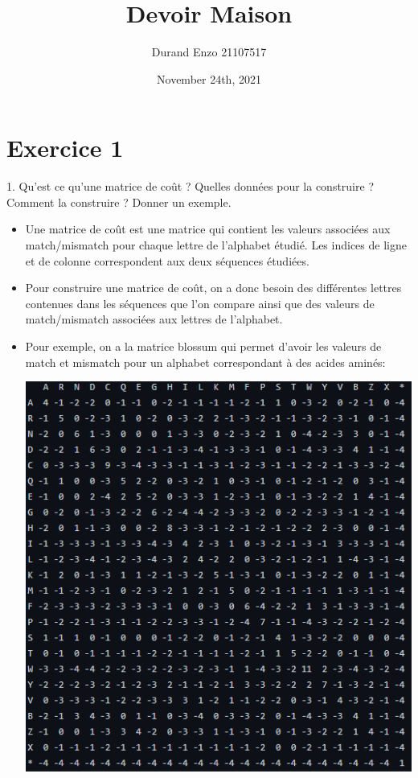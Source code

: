 \documentclass[
	12pt, %
]{fphw}
\title{Devoir Maison} %
\author{Durand Enzo 21107517} %
\date{November 24th, 2021} %
\institute{Sorbonne Université} %
\begin{document}
\maketitle %


\section*{Exercice 1}

\begin{problem}
	1. Qu'est ce qu'une matrice de coût ? Quelles données pour la construire ? Comment la construire ? Donner un exemple.
\end{problem}
\begin{center}
	\begin{itemize}
		\item Une matrice de coût est une matrice qui contient les valeurs associées aux match/mismatch pour chaque lettre de l'alphabet étudié. Les indices de ligne et de colonne correspondent aux deux séquences étudiées.
		\item Pour construire une matrice de coût, on a donc besoin des différentes lettres contenues dans les séquences que l'on compare ainsi que des valeurs de match/mismatch associées aux lettres de l'alphabet.
		\item Pour exemple, on a la matrice blossum qui permet d'avoir les valeurs de match et mismatch pour un alphabet correspondant à des acides aminés: 
			\begin{center}
				\includegraphics[width=0.5\columnwidth]{blossum.png} %
			\end{center}
	\end{itemize}
\end{center}
\end{document}
